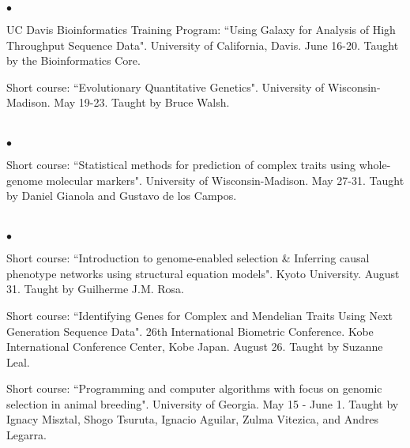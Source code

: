 \documentclass[margin,line,10pt]{res}
\newenvironment{list2}{
  \begin{list}{$\bullet$}{%
      \setlength{\itemsep}{0in}
      \setlength{\parsep}{0in} \setlength{\parskip}{0in}
      \setlength{\topsep}{0in} \setlength{\partopsep}{0in} 
      \setlength{\leftmargin}{0.2in}}}{\end{list}}
\begin{document}
\begin{resume}
\begin{list2}
\item UC Davis Bioinformatics Training Program: 
``Using Galaxy for Analysis of High Throughput Sequence Data". University of California, Davis. June 16-20. 
Taught by the Bioinformatics Core. 

\vspace{0.5cm}

\item Short course: ``Evolutionary Quantitative Genetics". University of Wisconsin-Madison. May 19-23. 
Taught by Bruce Walsh. 

\end{list2}

\section{}
\begin{list2}
\item Short course: ``Statistical methods for prediction of complex traits using whole-genome molecular markers". University of Wisconsin-Madison. May 27-31. 
Taught by Daniel Gianola and Gustavo de los Campos.
\end{list2}  

\section{}
\begin{list2}
\item Short course: ``Introduction to genome-enabled selection \& Inferring causal phenotype networks using structural equation models". 
Kyoto University. August 31. Taught by Guilherme J.M. Rosa. 

\vspace{0.5cm}

\item Short course: ``Identifying Genes for Complex and Mendelian Traits Using Next Generation Sequence Data". 26th International Biometric Conference. Kobe International Conference Center, Kobe Japan. August 26. Taught by Suzanne Leal.  

\vspace{0.5cm}

\item Short course: ``Programming and computer algorithms with focus on genomic selection in animal breeding".  University of Georgia. May 15 - June 1.  
Taught by Ignacy Misztal, Shogo Tsuruta, Ignacio Aguilar, Zulma Vitezica, and  Andres Legarra. 
\end{list2}  


\end{resume}
\end{document}
